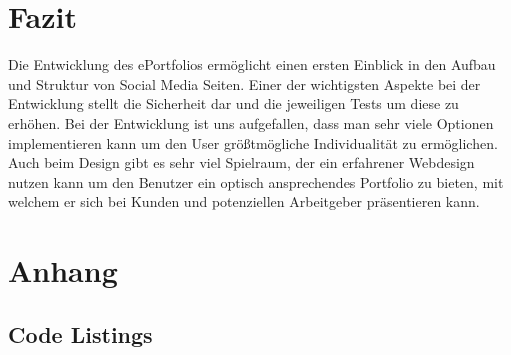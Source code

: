 \documentclass[10pt]{scrarticle}
\begin{document}
\section{Fazit}

Die Entwicklung des ePortfolios ermöglicht einen ersten Einblick in den Aufbau und Struktur von Social Media Seiten. Einer der wichtigsten Aspekte bei der Entwicklung stellt die Sicherheit dar und die jeweiligen Tests um diese zu erhöhen. Bei der Entwicklung ist uns aufgefallen, dass man sehr viele Optionen implementieren kann um den User größtmögliche Individualität zu ermöglichen. Auch beim Design gibt es sehr viel Spielraum, der ein erfahrener Webdesign nutzen kann um den Benutzer ein optisch ansprechendes Portfolio zu bieten, mit welchem er sich bei Kunden und potenziellen Arbeitgeber präsentieren kann.

\section{Anhang}

\subsection{Code Listings}
\end{document}
